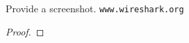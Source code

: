 \documentclass[../../main.tex]{subfiles}
\begin{document}
\begin{wts}
Provide a screenshot. \lstinline{www.wireshark.org} 
\end{wts}
\begin{proof}

\end{proof}
\end{document}
